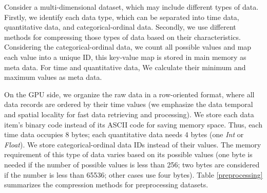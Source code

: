   

Consider a multi-dimensional dataset, which may include different types of data.  Firstly, we identify each data type, which can be separated into time data, quantitative data, and categorical-ordinal data. Secondly, we use different methods for compressing those types of data based on their characteristics.    
Considering the categorical-ordinal data, we count  all possible values and map each value into a unique ID, this key-value map is stored in main memory as meta data.
For time and quantitative data, We calculate their minimum and maximum values as meta data.

On the GPU side, we organize the raw data in a row-oriented format, where all data records are ordered by their time values (we emphasize the data temporal and spatial locality for fast data retrieving and processing). We store each data item's binary code instead of its ASCII code for saving memory space. Thus, each time data  occupies 8 bytes; each quantitative data needs 4 bytes (one \textit{Int} or \textit{Float}). We store categorical-ordinal data IDs instead of their values. The memory requirement of this type of data varies based on its possible values (one byte is needed if the number of possible values is less than 256; two bytes are considered if the number is less than 65536; other cases use four bytes). Table \ref{preprocessing} summarizes the compression methods for preprocessing datasets. %


